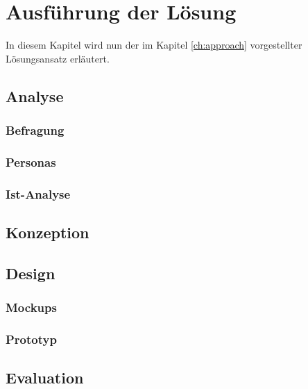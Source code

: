 \chapter{Ausführung der Lösung}\label{ch:solution}
In diesem Kapitel wird nun der im Kapitel \ref{ch:approach} vorgestellter Lösungsansatz erläutert.

\section{Analyse}



\subsection{Befragung}



\subsection{Personas}



\subsection{Ist-Analyse}

\section{Konzeption}

\section{Design}

\subsection{Mockups}

\subsection{Prototyp}

\section{Evaluation}